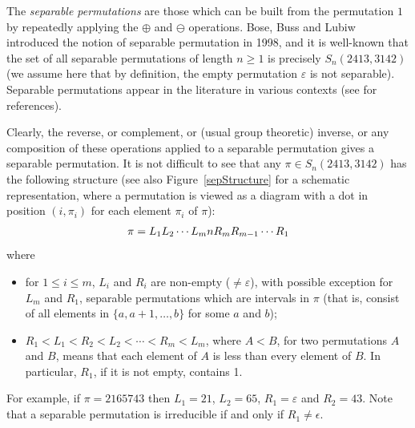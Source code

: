 \documentclass[12pt]{article}
\begin{document}
The {\em separable permutations} are those which can be built from the permutation $1$ by repeatedly applying the $\oplus$ and $\ominus$ operations. Bose, Buss and Lubiw~\cite{BBL98} introduced the notion of separable permutation in 1998, and it is well-known \cite{Kit} that the set of all separable permutations of length $n\geq 1$ is precisely $S_n(2413,3142)$ (we assume here that by definition, the empty permutation $\varepsilon$ is not separable).  Separable permutations appear in the literature in various contexts (see \cite{CKZ2024} for references). 

Clearly, the reverse, or complement, or (usual group theoretic) inverse, or any composition of these operations applied to a separable permutation gives a separable permutation. It is not difficult to see that any $\pi\in S_n(2413,3142)$ has the following structure (see also Figure~\ref{sepStructure} for a schematic representation, where a permutation is viewed as a diagram with a dot in position $(i,\pi_i)$ for each element $\pi_i$ of $\pi$):
\begin{align}
	\pi=L_1L_2\cdots
	L_mnR_mR_{m-1}\cdots R_1\notag
\end{align}
where
\begin{itemize}
	\item[(1)] for $1\leq i\leq m$, $L_i$ and $R_i$ are non-empty ($\neq \varepsilon$), with possible exception for
	$L_m$ and $R_1$, separable permutations which are intervals in $\pi$ (that is, consist of all elements in $\{a,a+1,\ldots,b\}$ for some $a$ and $b$);
	\item[(2)]  $R_1<L_1<R_2<L_2<\cdots <R_m<L_m$, where $A<B$, for two
	permutations $A$ and $B$, means that each element of $A$ is less than
	every element of $B$. In particular, $R_1$, if it is not empty,
	contains 1.
\end{itemize}

\noindent
For example, if $\pi=2165743$ then $L_1=21$, $L_2=65$, $R_1=\varepsilon$ and $R_2=43$. Note that a separable permutation is irreducible if and only if $R_1\neq \epsilon$.
\end{document}
